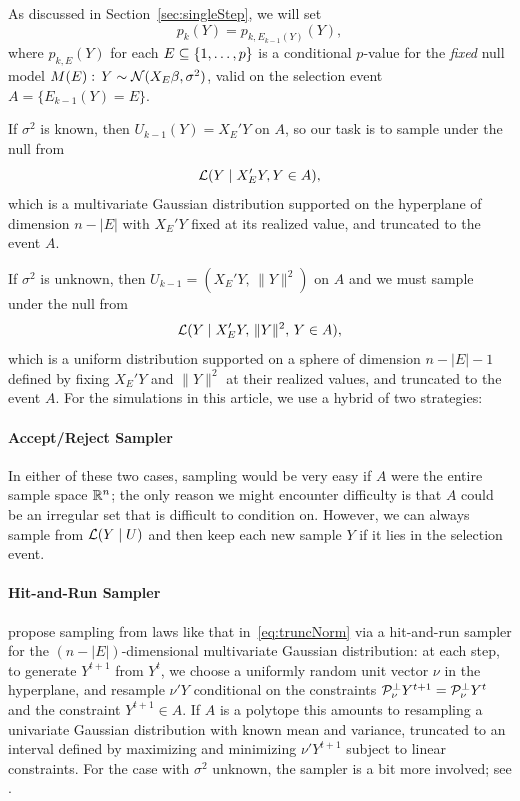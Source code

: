 \documentclass{article}
\begin{document}
\begin{appendix}
As discussed in Section~\ref{sec:singleStep}, we will set
\[
p_k(Y) = p_{k, E_{k-1}(Y)}(Y),
\]
where $p_{k,E}(Y)$ for each $E\subseteq \{1,\ldots, p\}$ is a conditional $p$-value for the {\em fixed} null model $M(E):\, Y \sim \mathcal{N}(X_E\beta, \sigma^2)$, valid on the selection event $A=\{E_{k-1}(Y)=E\}$.

If $\sigma^2$ is known, then $U_{k-1}(Y) = X_{E}'Y$ on $A$, so our task is to sample under the null from
\begin{equation}\label{eq:truncNorm}
\mathcal{L}(Y \mid X_E'Y, Y\in A),
\end{equation}
which is a multivariate Gaussian distribution supported on the hyperplane of dimension $n-|E|$ with $X_E'Y$ fixed at its realized value, and truncated to the event $A$. 

If $\sigma^2$ is unknown, then $U_{k-1}=(X_E'Y,\, \|Y\|^2)$ on $A$ and we must sample under the null from
\begin{equation}\label{eq:truncUnif}
\mathcal{L}(Y \mid X_E'Y,\, \|Y\|^2,\, Y\in A),
\end{equation}
which is a uniform distribution supported on a sphere of dimension $n-|E|-1$ defined by fixing $X_E'Y$ and $\|Y\|^2$ at their realized values, and truncated to the event $A$. For the simulations in this article, we use a hybrid of two strategies:

\paragraph{Accept/Reject Sampler} In either of these two cases, sampling would be very easy if $A$ were the entire sample space $\mathbb{R}^n$; the only reason we might encounter difficulty is that $A$ could be an irregular set that is difficult to condition on. However, we can always sample from $\mathcal{L}(Y \mid U)$ and then keep each new sample $Y$ if it lies in the selection event.

\paragraph{Hit-and-Run Sampler} \citet{fithian2014optimal} propose sampling from laws like that in~\eqref{eq:truncNorm} via a hit-and-run sampler for the $(n-|E|)$-dimensional multivariate Gaussian distribution: at each step, to generate $Y^{t+1}$ from $Y^t$, we choose a uniformly random unit vector $\nu$ in the hyperplane, and resample $\nu'Y$ conditional on the constraints $\mathcal{P}_{\nu}^\perp Y^{t+1}=\mathcal{P}_{\nu}^\perp Y^t$ and the constraint $Y^{t+1}\in A$. If $A$ is a polytope this amounts to resampling a univariate Gaussian distribution with known mean and variance, truncated to an interval defined by maximizing and minimizing $\nu'Y^{t+1}$ subject to linear constraints. For the case with $\sigma^2$ unknown, the sampler is a bit more involved; see \citet{fithian2014optimal}.


\end{appendix}
\end{document}
